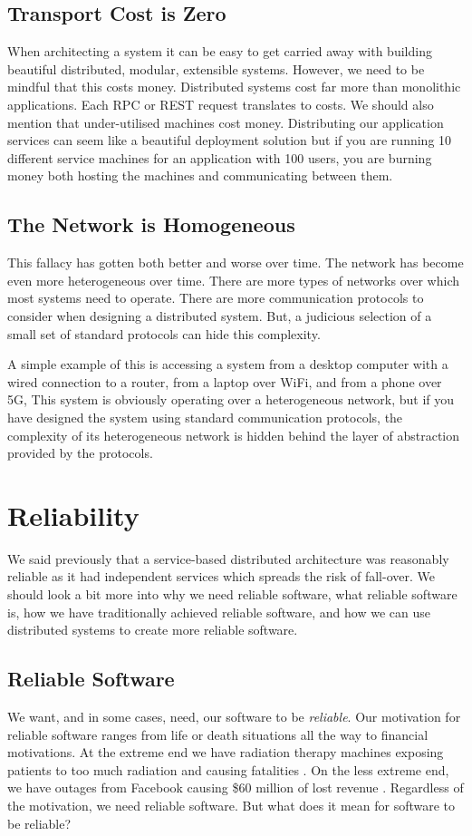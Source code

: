 \subsection{Transport Cost is Zero}
When architecting a system it can be easy to get carried away with building beautiful distributed, modular, extensible systems.
However, we need to be mindful that this costs money.
Distributed systems cost far more than monolithic applications.
Each RPC or REST request translates to costs.
We should also mention that under-utilised machines cost money.
Distributing our application services can seem like a beautiful deployment solution
but if you are running 10 different service machines for an application with 100 users,
you are burning money both hosting the machines and communicating between them.

\subsection{The Network is Homogeneous}
This fallacy has gotten both better and worse over time.
The network has become even more heterogeneous over time.
There are more types of networks over which most systems need to operate.
There are more communication protocols to consider when designing a distributed system.
But, a judicious selection of a small set of standard protocols can hide this complexity.

A simple example of this is accessing a system from a desktop computer with a wired connection to a router,
from a laptop over WiFi, and from a phone over 5G,
This system is obviously operating over a heterogeneous network,
but if you have designed the system using standard communication protocols,
the complexity of its heterogeneous network is hidden behind the layer of abstraction provided by the protocols.


\section{Reliability}
We said previously that a service-based distributed architecture was reasonably reliable as it had independent services which spreads the risk of fall-over.
We should look a bit more into why we need reliable software,
what reliable software is,
how we have traditionally achieved reliable software,
and how we can use distributed systems to create more reliable software.

\subsection{Reliable Software}
We want, and in some cases, need, our software to be \textsl{reliable}.
Our motivation for reliable software ranges from life or death situations all the way to financial motivations.
At the extreme end we have radiation therapy machines exposing patients to too much radiation and causing fatalities \cite{therac}.
On the less extreme end,
we have outages from Facebook causing \$60 million of lost revenue \cite{facebook-outage}.
Regardless of the motivation,
we need reliable software.
But what does it mean for software to be reliable?

